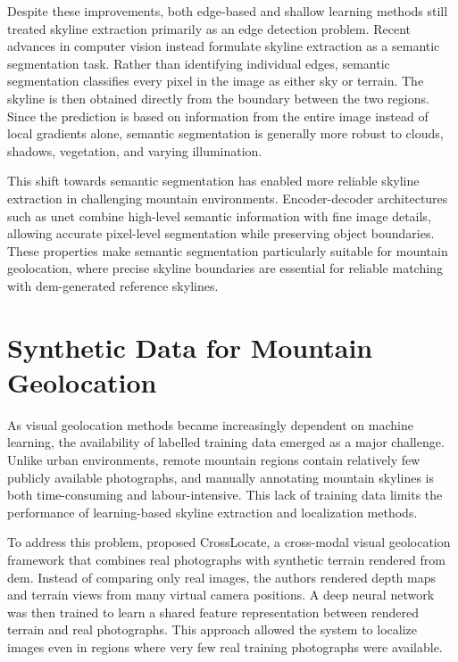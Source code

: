 Despite these improvements, both edge-based and shallow learning methods still treated skyline extraction primarily as an edge detection problem. Recent advances in computer vision instead formulate skyline extraction as a semantic segmentation task. Rather than identifying individual edges, semantic segmentation classifies every pixel in the image as either sky or terrain. The skyline is then obtained directly from the boundary between the two regions. Since the prediction is based on information from the entire image instead of local gradients alone, semantic segmentation is generally more robust to clouds, shadows, vegetation, and varying illumination.

This shift towards semantic segmentation has enabled more reliable skyline extraction in challenging mountain environments. Encoder-decoder architectures such as \Gls{unet} combine high-level semantic information with fine image details, allowing accurate pixel-level segmentation while preserving object boundaries. These properties make semantic segmentation particularly suitable for mountain geolocation, where precise skyline boundaries are essential for reliable matching with \Gls{dem}-generated reference skylines.

\section{Synthetic Data for Mountain Geolocation}

As visual geolocation methods became increasingly dependent on machine learning, the availability of labelled training data emerged as a major challenge. Unlike urban environments, remote mountain regions contain relatively few publicly available photographs, and manually annotating mountain skylines is both time-consuming and labour-intensive. This lack of training data limits the performance of learning-based skyline extraction and localization methods.

To address this problem, \cite{tomesek2022crosslocate} proposed CrossLocate, a cross-modal visual geolocation framework that combines real photographs with synthetic terrain rendered from \Gls{dem}. Instead of comparing only real images, the authors rendered depth maps and terrain views from many virtual camera positions. A deep neural network was then trained to learn a shared feature representation between rendered terrain and real photographs. This approach allowed the system to localize images even in regions where very few real training photographs were available.

